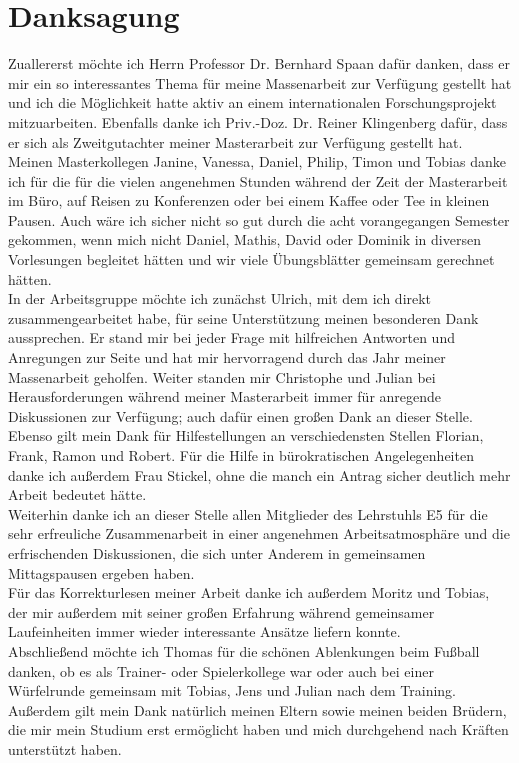 \section*{Danksagung}

Zuallererst möchte ich Herrn Professor Dr. Bernhard Spaan dafür danken, dass er mir ein so interessantes Thema für meine Massenarbeit zur Verfügung gestellt hat und ich die Möglichkeit hatte aktiv an einem internationalen Forschungsprojekt mitzuarbeiten. Ebenfalls danke ich Priv.-Doz. Dr. Reiner Klingenberg dafür, dass er sich als Zweitgutachter meiner Masterarbeit zur Verfügung gestellt hat.\\
Meinen Masterkollegen Janine, Vanessa, Daniel, Philip, Timon und Tobias danke ich für die für die vielen angenehmen Stunden während der Zeit der Masterarbeit im Büro, auf Reisen zu Konferenzen oder bei einem Kaffee oder Tee in kleinen Pausen. Auch wäre ich sicher nicht so gut durch die acht vorangegangen Semester gekommen, wenn mich nicht Daniel, Mathis, David oder Dominik in diversen Vorlesungen begleitet hätten und wir viele Übungsblätter gemeinsam gerechnet hätten.\\
In der Arbeitsgruppe möchte ich zunächst Ulrich, mit dem ich direkt zusammengearbeitet habe, für seine Unterstützung meinen besonderen Dank aussprechen. Er stand mir bei jeder Frage mit hilfreichen Antworten und Anregungen zur Seite und hat mir hervorragend durch das Jahr meiner Massenarbeit geholfen. Weiter standen mir Christophe und Julian bei Herausforderungen während meiner Masterarbeit immer für anregende Diskussionen zur Verfügung; auch dafür einen großen Dank an dieser Stelle. Ebenso gilt mein Dank für Hilfestellungen an verschiedensten Stellen Florian, Frank, Ramon und Robert. Für die Hilfe in bürokratischen Angelegenheiten danke ich außerdem Frau Stickel, ohne die manch ein Antrag sicher deutlich mehr Arbeit bedeutet hätte.\\
Weiterhin danke ich an dieser Stelle allen Mitglieder des Lehrstuhls E5 für die sehr erfreuliche Zusammenarbeit in einer angenehmen Arbeitsatmosphäre und die erfrischenden Diskussionen, die sich unter Anderem in gemeinsamen Mittagspausen ergeben haben. \\ 
Für das Korrekturlesen meiner Arbeit danke ich außerdem Moritz und Tobias, der mir außerdem mit seiner großen Erfahrung während gemeinsamer Laufeinheiten immer wieder interessante Ansätze liefern konnte.\\
Abschließend möchte ich Thomas für die schönen Ablenkungen beim Fußball danken, ob es als Trainer- oder Spielerkollege war oder auch bei einer Würfelrunde gemeinsam mit Tobias, Jens und Julian nach dem Training. Außerdem gilt mein Dank natürlich meinen Eltern sowie meinen beiden Brüdern, die mir mein Studium erst ermöglicht haben und mich durchgehend nach Kräften unterstützt haben.
